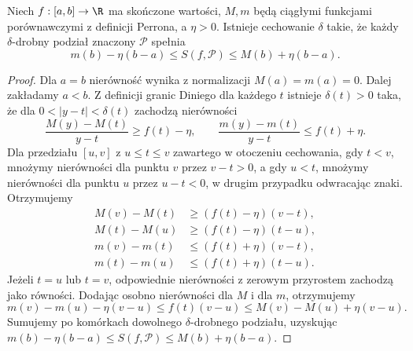 \begin{stwierdzenie}\label{st:perron-sumy}
Niech $f:[a,b]\to\R$ ma skończone wartości, $M,m$ będą ciągłymi funkcjami porównawczymi z definicji Perrona, a $\eta>0$. Istnieje cechowanie $\delta$ takie, że każdy $\delta$-drobny podział znaczony $\mathcal P$ spełnia
\[
 m(b)-\eta(b-a)\le S(f,\mathcal P)\le M(b)+\eta(b-a).
\]
\end{stwierdzenie}
\begin{proof}
Dla $a=b$ nierówność wynika z normalizacji $M(a)=m(a)=0$.
Dalej zakładamy $a<b$. Z definicji granic Diniego dla każdego $t$ istnieje $\delta(t)>0$ taka, że dla $0<|y-t|<\delta(t)$ zachodzą nierówności
\[
\frac{M(y)-M(t)}{y-t}\ge f(t)-\eta,\qquad
\frac{m(y)-m(t)}{y-t}\le f(t)+\eta.
\]
Dla przedziału $[u,v]$ z $u\le t\le v$ zawartego w otoczeniu cechowania, gdy $t<v$, mnożymy nierówności dla punktu $v$ przez $v-t>0$, a gdy $u<t$, mnożymy nierówności dla punktu $u$ przez $u-t<0$, w drugim przypadku odwracając znaki. Otrzymujemy
\[
 \begin{aligned}
 M(v)-M(t)&\ge(f(t)-\eta)(v-t),\\
 M(t)-M(u)&\ge(f(t)-\eta)(t-u),\\
 m(v)-m(t)&\le(f(t)+\eta)(v-t),\\
 m(t)-m(u)&\le(f(t)+\eta)(t-u).
 \end{aligned}
\]
Jeżeli $t=u$ lub $t=v$, odpowiednie nierówności z zerowym przyrostem zachodzą jako równości. Dodając osobno nierówności dla $M$ i dla $m$, otrzymujemy
\[
m(v)-m(u)-\eta(v-u)\le f(t)(v-u)\le M(v)-M(u)+\eta(v-u).
\]
Sumujemy po komórkach dowolnego $\delta$-drobnego podziału, uzyskując $m(b)-\eta(b-a)\le S(f,\mathcal P)\le M(b)+\eta(b-a)$.
\end{proof}

